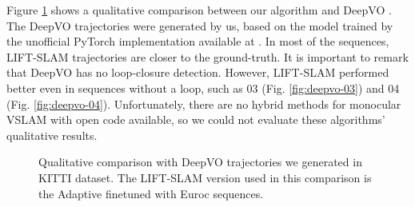 Figure \ref{fig:deepvo-vs-ours} shows a qualitative comparison between our algorithm and DeepVO \cite{deep-vo}. The DeepVO trajectories were generated by us, based on the model trained by the unofficial PyTorch implementation available at \cite{deepvo-github}. In most of the sequences, LIFT-SLAM trajectories are closer to the ground-truth. It is important to remark that DeepVO has no loop-closure detection. However, LIFT-SLAM performed better even in sequences without a loop, such as 03 (Fig. \ref{fig:deepvo-03}) and 04 (Fig. \ref{fig:deepvo-04}). Unfortunately, there are no hybrid methods for monocular VSLAM with open code available, so we could not evaluate these algorithms' qualitative results.


\begin{figure}
\centering
{}
\qquad
{}

\qquad
{}

\qquad
{}


\caption{Qualitative comparison with DeepVO trajectories we generated in KITTI dataset. The LIFT-SLAM version used in this comparison is the Adaptive finetuned with Euroc sequences.}
\label{fig:deepvo-vs-ours}
\end{figure}